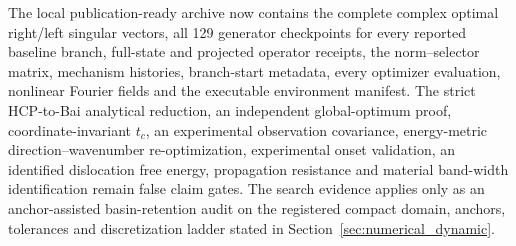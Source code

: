 The local publication-ready archive now contains the complete complex optimal right/left singular vectors, all 129 generator checkpoints for every reported baseline branch, full-state and projected operator receipts, the norm--selector matrix, mechanism histories, branch-start metadata, every optimizer evaluation, nonlinear Fourier fields and the executable environment manifest. The strict HCP-to-Bai analytical reduction, an independent global-optimum proof, coordinate-invariant $t_c$, an experimental observation covariance, energy-metric direction--wavenumber re-optimization, experimental onset validation, an identified dislocation free energy, propagation resistance and material band-width identification remain false claim gates. The search evidence applies only as an anchor-assisted basin-retention audit on the registered compact domain, anchors, tolerances and discretization ladder stated in Section~\ref{sec:numerical_dynamic}.
